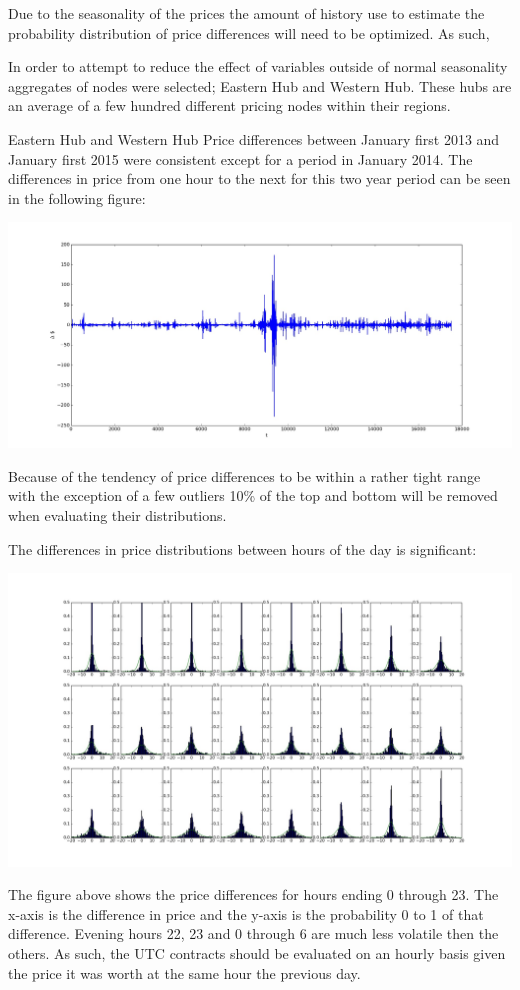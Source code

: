 \documentclass{report}
\begin{document}
Due to the seasonality of the prices the amount of history use to estimate the
probability distribution of price differences will need to be optimized. As such,

In order to attempt to reduce the effect of variables outside of normal seasonality
aggregates of nodes were selected; Eastern Hub and Western Hub. These hubs are an average
of a few hundred different pricing nodes within their regions.

Eastern Hub and Western Hub Price differences between January first 2013 and
January first 2015 were consistent except for a period in January 2014. The differences in
price from one hour to the next for this two year period can be seen in the
following figure:
\begin{center}
\includegraphics[width=500pt, keepaspectratio=true]{price_differences.jpg}\\
\end{center}
Because of the tendency of price differences to be within a rather tight range
with the exception of a few outliers 10\% of the top and bottom will be removed when
evaluating their distributions.

The differences in price distributions between hours of the day is significant:
\begin{center}
\includegraphics[width=500pt, keepaspectratio=true]{hourly_distributions.jpg}\\
\end{center}
The figure above shows the price differences for hours ending 0 through 23. The x-axis
is the difference in price and the y-axis is the probability 0 to 1 of that difference.
Evening hours 22, 23 and 0 through 6 are much less volatile then the others. As such,
the UTC contracts should be evaluated on an hourly basis given the price it was
worth at the same hour the previous day.
\end{document}
